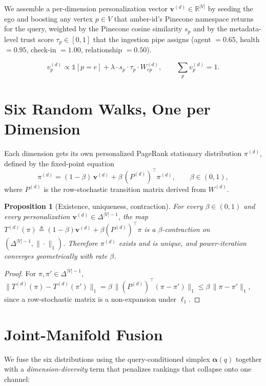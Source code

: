 \documentclass[11pt]{article}
\newtheorem{proposition}{Proposition}
\begin{document}
We assemble a per-dimension personalization vector
$\bm{v}^{(d)}\in\mathbb{R}^{|V|}$ by seeding the ego and boosting any
vertex $p\in V$ that amber-id's Pinecone namespace returns for the
query, weighted by the Pinecone cosine similarity $s_p$ and by the
metadata-level trust score $\tau_p\in[0,1]$ that the ingestion pipe
assigns (agent $=0.65$, health $=0.95$, check-in $=1.00$,
relationship $=0.50$).

\begin{equation}
v^{(d)}_p \propto
\mathbb{1}[p=e] + \lambda \cdot s_p \cdot \tau_p \cdot W^{(d)}_{ep},
\qquad
\sum_p v^{(d)}_p = 1.
\end{equation}

\section{Six Random Walks, One per Dimension}

Each dimension gets its own personalized PageRank stationary
distribution $\pi^{(d)}$, defined by the fixed-point equation
\begin{equation}
\pi^{(d)} = (1 - \beta)\, \bm{v}^{(d)}
          + \beta \, (P^{(d)})^\top \pi^{(d)},
\qquad \beta \in (0,1),
\end{equation}
where $P^{(d)}$ is the row-stochastic transition matrix derived from
$W^{(d)}$.

\begin{proposition}[Existence, uniqueness, contraction]
For every $\beta \in (0,1)$ and every personalization
$\bm{v}^{(d)}\in\Delta^{|V|-1}$, the map
$T^{(d)}(\pi)\triangleq (1-\beta)\bm{v}^{(d)} + \beta(P^{(d)})^\top\pi$
is a $\beta$-contraction on $(\Delta^{|V|-1},\|\cdot\|_1)$. Therefore
$\pi^{(d)}$ exists and is unique, and power-iteration converges
geometrically with rate $\beta$.
\end{proposition}

\begin{proof}
For $\pi, \pi' \in \Delta^{|V|-1}$,
$\|T^{(d)}(\pi) - T^{(d)}(\pi')\|_1
 = \beta\, \| (P^{(d)})^\top (\pi - \pi') \|_1
 \le \beta\, \|\pi - \pi'\|_1$,
since a row-stochastic matrix is a non-expansion under $\ell_1$.
\end{proof}

\section{Joint-Manifold Fusion}

We fuse the six distributions using the query-conditioned simplex
$\bm{\alpha}(q)$ together with a \emph{dimension-diversity} term that
penalizes rankings that collapse onto one channel:
\end{document}
